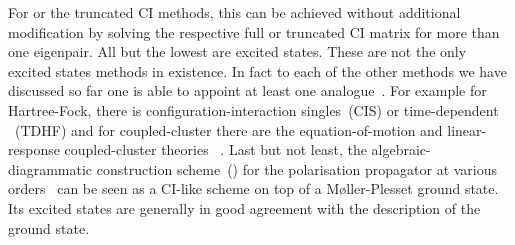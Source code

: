 For \FCI or the truncated CI methods,
this can be achieved without additional modification
by solving the respective full or truncated CI matrix
for more than one eigenpair.
All but the lowest are excited states.
These are not the only excited states methods in existence.
In fact to each of the other methods we have discussed
so far one is able to appoint at least one analogue~\cite{Dreuw2005}.
For example for Hartree-Fock, there is configuration-interaction singles~(CIS)
or time-dependent \HF~(TDHF) and
for coupled-cluster there
are the equation-of-motion and linear-response coupled-cluster theories%
~\cite{Schirmer2010,Sekino1984}.
Last but not least, the algebraic-diagrammatic construction scheme~(\ADC)
for the polarisation propagator at various orders~\cite{Schirmer1982,Trofimov1999}
can be seen as a CI-like scheme on top of a Møller-Plesset ground state.
Its excited states are generally in good agreement with the \MP
description of the ground state.
